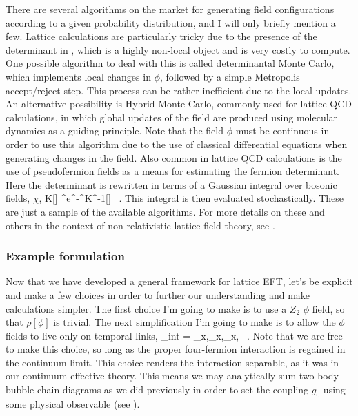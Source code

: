 There are several algorithms on the market for generating field configurations according to a given probability distribution, and I will only briefly mention a few. Lattice calculations are particularly tricky due to the presence of the determinant in , which is a highly non-local object and is very costly to compute. One possible algorithm to deal with this is called determinantal Monte  Carlo, which implements local changes in $\phi$, followed by a simple Metropolis accept/reject step. This process can be rather inefficient due to the local updates. An alternative possibility is Hybrid Monte Carlo, commonly used for lattice QCD calculations, in which global updates of the field are produced using molecular dynamics as a guiding principle. Note that the field $\phi$ must be continuous in order to use this algorithm due to the use of classical differential equations when generating changes in the field. Also common in lattice QCD calculations is the use of pseudofermion fields as a means for estimating the fermion determinant. Here the determinant is rewritten in terms of a Gaussian integral over bosonic fields, $\chi$,
\beq
\det K[\phi] \propto \int \calD \chi^{\dagger}\calD \chi e^{-\chi^{\dagger}K^{-1}[\phi]\chi} \ .
\eeq
This integral is then evaluated stochastically. These are just a sample of the available algorithms. For more details on these and others in the context of non-relativistic lattice field theory, see \cite{Drut:2012md}.

\subsubsection{Example formulation}
Now that we have developed a general framework for lattice EFT, let's be explicit and make a few choices in order to further our understanding and make calculations simpler. The first choice I'm going to make is to use a $Z_2$ $\phi$ field, so that $\rho[\phi]$ is trivial. The next simplification I'm going to make is to allow the $\phi$ fields to live only on temporal links,
\beq
\label{eq:pointint}
\calL_{\mbox{\tiny int}} = \phi_{x,\tau}\psidag_{x,\tau}\psi_{x,} \ .
\eeq
Note that we are free to make this choice, so long as the proper four-fermion interaction is regained in the continuum limit. This choice renders the interaction separable, as it was in our continuum effective theory. This means we may analytically sum two-body bubble chain diagrams as we did previously in order to set the coupling $g_0$ using some physical observable (see ). 

